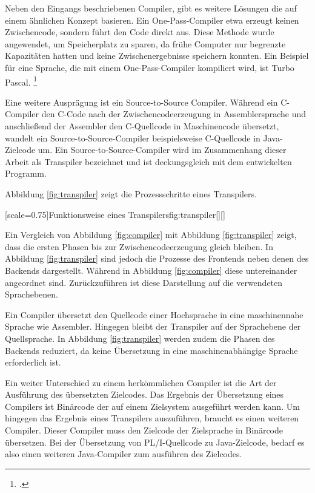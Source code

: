 Neben den Eingangs beschriebenen Compiler, gibt es weitere Lösungen die auf einem ähnlichen Konzept basieren.
Ein One-Pass-Compiler etwa erzeugt keinen Zwischencode, sondern führt den Code direkt aus. Diese Methode wurde angewendet, um Speicherplatz zu sparen, da frühe Computer nur begrenzte Kapazitäten hatten und keine Zwischenergebnisse speichern konnten. Ein Beispiel für eine Sprache, die mit einem One-Pass-Compiler kompiliert wird, ist Turbo Pascal. \footcite[Vgl. ][]{onepass}

Eine weitere Ausprägung ist ein Source-to-Source Compiler.
Während ein C-Compiler den C-Code nach der Zwischencodeerzeugung in Assemblersprache und anschließend der Assembler den C-Quellcode in Maschinencode übersetzt, wandelt ein Source-to-Source-Compiler beispielsweise C-Quellcode in Java-Zielcode um. 
Ein Source-to-Source-Compiler wird im Zusammenhang dieser Arbeit als Transpiler bezeichnet und ist deckungsgleich mit dem entwickelten Programm.

Abbildung \ref{fig:transpiler} zeigt die Prozessschritte eines Transpilers.

\pagebreak
{}[scale=0.75]{Funktionsweise eines Transpilers}{fig:transpiler}[][]
\pagebreak

Ein Vergleich von Abbildung \ref{fig:compiler} mit Abbildung \ref{fig:transpiler} zeigt, dass die ersten Phasen bis zur Zwischencodeerzeugung gleich bleiben. In Abbildung \ref{fig:transpiler} sind jedoch die Prozesse des Frontends neben denen des Backends dargestellt. Während in Abbildung \ref{fig:compiler} diese untereinander angeordnet sind. Zurückzuführen ist diese Darstellung auf die verwendeten Sprachebenen.

Ein Compiler übersetzt den Quellcode einer Hochsprache in eine maschinennahe Sprache wie Assembler. Hingegen bleibt der Transpiler auf der Sprachebene der Quellsprache. In Abbildung \ref{fig:transpiler} werden zudem die Phasen des Backends reduziert, da keine Übersetzung in eine maschinenabhängige Sprache erforderlich ist.

Ein weiter Unterschied zu einem herkömmlichen Compiler ist die Art der Ausführung des übersetzten Zielcodes.
Das Ergebnis der Übersetzung eines Compilers ist Binärcode der auf einem Zielsystem ausgeführt werden kann. Um hingegen das Ergebnis eines Transpilers auszuführen,
braucht es einen weiteren Compiler. Dieser Compiler muss den Zielcode der Zielsprache in Binärcode übersetzen.
Bei der Übersetzung von PL/I-Quellcode zu Java-Zielcode, bedarf es also einen weiteren Java-Compiler zum ausführen des Zielcodes.

